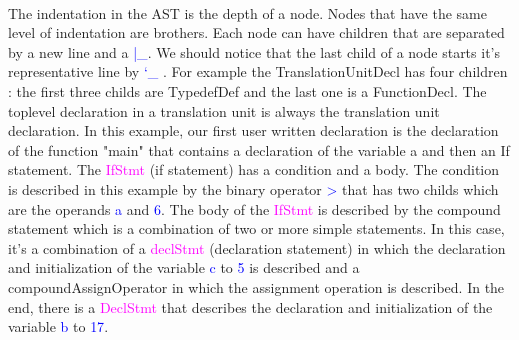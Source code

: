 \documentclass{report}
\begin{document}
\paragraph{}
\hspace{4mm}\textnormal{
The indentation in the AST is the depth of a node. Nodes that have
the same level of indentation are brothers. Each node can have 
children that are separated by a new line and a \textcolor{blue}{|\_}. We should notice
that the last child of a node starts it's representative line by \textcolor{blue}{`\_}
. For example the \textcolor{oliveGreen}{TranslationUnitDecl} has four children :
the first three childs are \textcolor{oliveGreen}{TypedefDef} and the last one is a \textcolor{oliveGreen}{FunctionDecl}.
The toplevel declaration in a translation unit is always the
 translation unit declaration. 
In this example, our first user written declaration 
is the declaration of the function "main" that contains
a declaration of the variable a and then an If statement.
The \textcolor{magenta}{IfStmt} (if statement) has a condition and a body. The condition is 
described in this example by the binary operator \textcolor{blue}{>} that has two
childs which are the operands \textcolor{blue}{a} and \textcolor{blue}{6}. 
The body of the \textcolor{magenta}{IfStmt} is described by the compound statement which is 
a combination of two or more simple statements. In this case, it's 
a combination of a \textcolor{magenta}{declStmt} (declaration statement) in which the declaration and 
initialization of  the variable \textcolor{blue}{c} to \textcolor{blue}{5} 
is described and a compoundAssignOperator 
in which the assignment operation is described.
In the end, there is a \textcolor{magenta}{DeclStmt} that describes the declaration and initialization
of the variable \textcolor{blue}{b} to \textcolor{blue}{17}.}
\end{document}
